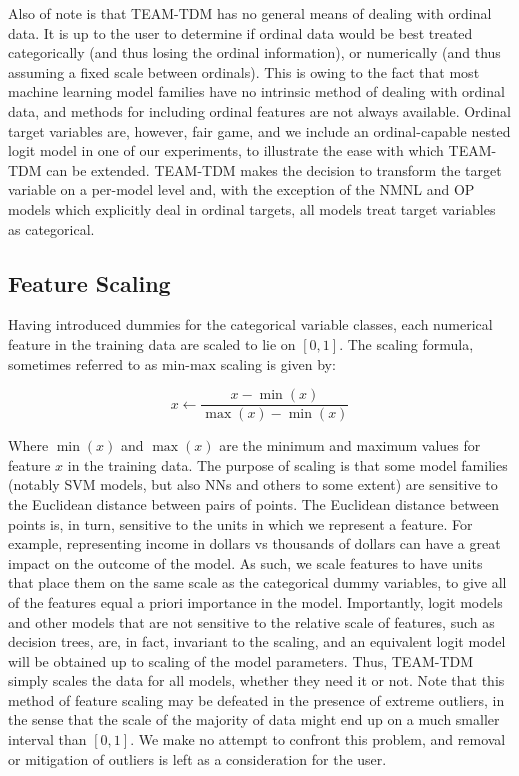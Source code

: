 \documentclass[conference]{IEEEtran}
\begin{document}
Also of note is that TEAM-TDM has no general means of dealing with ordinal data.
 It is up to the user to determine if ordinal data would be best treated categorically (and thus losing the ordinal information), or numerically (and thus assuming a fixed scale between ordinals).
 This is owing to the fact that most machine learning model families have no intrinsic method of dealing with ordinal data, and methods for including ordinal features are not always available.
 Ordinal target variables are, however, fair game, and we include an ordinal-capable nested logit model in one of our experiments, to illustrate the ease with which TEAM-TDM can be extended.
 TEAM-TDM makes the decision to transform the target variable on a per-model level and, with the exception of the NMNL and OP models which explicitly deal in ordinal targets, all models treat target variables as categorical.

\subsection{Feature Scaling} \label{subsection:scaling}

Having introduced dummies for the categorical variable classes, each numerical feature in the training data are scaled to lie on $[0,1]$.
 The scaling formula, sometimes referred to as min-max scaling is given by:

$$x \leftarrow \frac{x - \min(x)}{\max(x) - \min(x)}$$

Where $\min(x)$ and $\max(x)$ are the minimum and maximum values for feature $x$ in the training data.
 The purpose of scaling is that some model families (notably SVM models, but also NNs and others to some extent) are sensitive to the Euclidean distance between pairs of points.
 The Euclidean distance between points is, in turn, sensitive to the units in which we represent a feature.
 For example, representing income in dollars vs thousands of dollars can have a great impact on the outcome of the model.
 As such, we scale features to have units that place them on the same scale as the categorical dummy variables, to give all of the features equal a priori importance in the model.
 Importantly, logit models and other models that are not sensitive to the relative scale of features, such as decision trees, are, in fact, invariant to the scaling, and an equivalent logit model will be obtained up to scaling of the model parameters.
 Thus, TEAM-TDM simply scales the data for all models, whether they need it or not.
 Note that this method of feature scaling may be defeated in the presence of extreme outliers, in the sense that the scale of the majority of data might end up on a much smaller interval than $[0,1]$.
 We make no attempt to confront this problem, and removal or mitigation of outliers is left as a consideration for the user.
\end{document}
